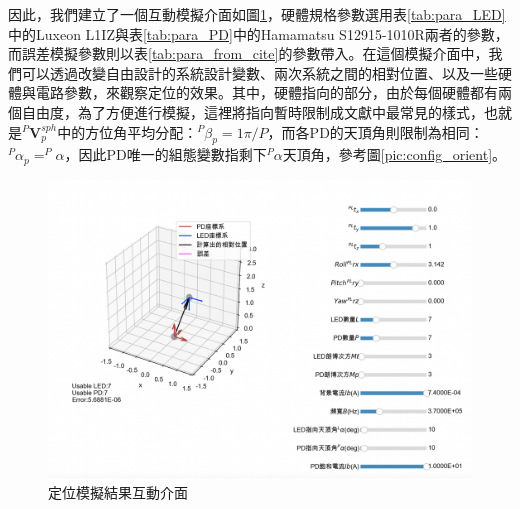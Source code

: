 





因此，我們建立了一個互動模擬介面如圖\ref{pic:result_interactive}，硬體規格參數選用表\ref{tab:para_LED}中的Luxeon L1IZ與表\ref{tab:para_PD}中的Hamamatsu S12915-1010R兩者的參數，而誤差模擬參數則以表\ref{tab:para_from_cite}的參數帶入。在這個模擬介面中，我們可以透過改變自由設計的系統設計變數、兩次系統之間的相對位置、以及一些硬體與電路參數，來觀察定位的效果。其中，硬體指向的部分，由於每個硬體都有兩個自由度，為了方便進行模擬，這裡將指向暫時限制成文獻中最常見的樣式，也就是$^P\boldsymbol{V}_p^{sph}$中的方位角平均分配：$^P\beta_p = 1\pi/P$，而各PD的天頂角則限制為相同：$^P\alpha_p =^P \alpha$，因此PD唯一的組態變數指剩下$^P\alpha$天頂角，參考圖\ref{pic:config_orient}。



\begin{figure}[htpb]
    \centering
    \includegraphics[width=15cm]{ch4pic/result_interactive.png}
    \caption{定位模擬結果互動介面}
    \label{pic:result_interactive}
\end{figure}



